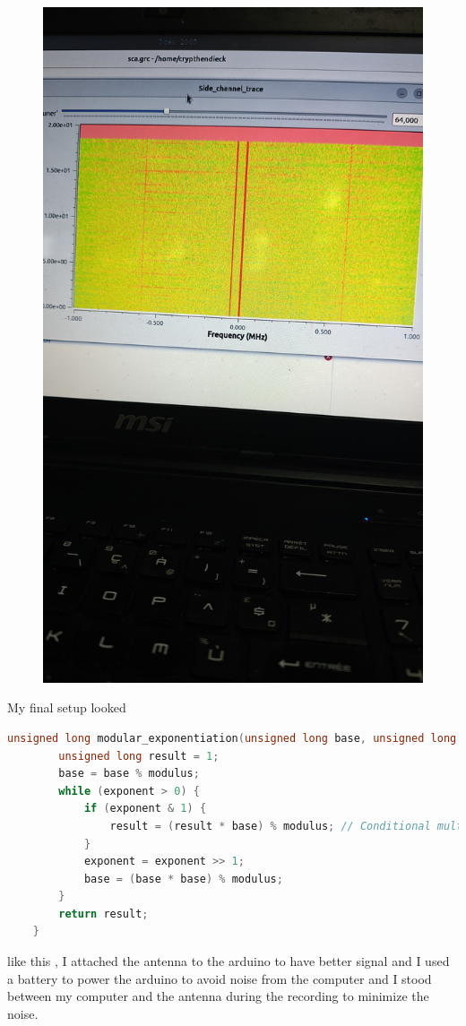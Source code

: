 \documentclass{article}
\begin{document}
\begin{figure}[h]
\includegraphics[width=\textwidth]{waterfall.jpeg}
\end{figure}
My final setup looked \begin{lstlisting}[language=C]
    unsigned long modular_exponentiation(unsigned long base, unsigned long exponent, unsigned long modulus) {
        unsigned long result = 1;
        base = base % modulus;
        while (exponent > 0) {
            if (exponent & 1) {
                result = (result * base) % modulus; // Conditional multiplication
            }
            exponent = exponent >> 1;
            base = (base * base) % modulus;
        }
        return result;
    }
    \end{lstlisting}like this , I attached the antenna to the arduino to have better signal and I used a battery to power the arduino to avoid noise from the computer and I stood between my computer and the antenna during the recording to minimize the noise.
\end{document}
